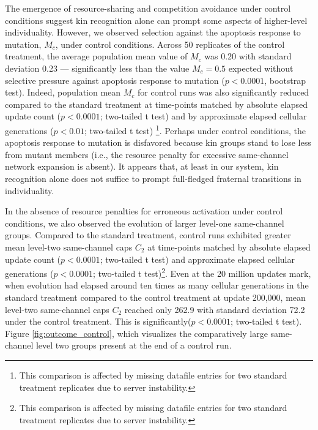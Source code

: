 The emergence of resource-sharing and competition avoidance under control conditions suggest kin recognition alone can prompt some aspects of higher-level individuality.
However, we observed selection against the apoptosis response to mutation, $M_{c}$, under control conditions.
Across 50 replicates of the control treatment, the average population mean value of $M_{c}$ was 0.20 with standard deviation 0.23 --- significantly less than the value $M_{c} = 0.5$ expected without selective pressure against apoptosis response to mutation ($p < 0.0001$, bootstrap test).
Indeed, population mean $M_{c}$ for control runs was also significantly reduced compared to the standard treatment at time-points matched by absolute elapsed update count ($p < 0.0001$; two-tailed t test) and by approximate elapsed cellular generations ($p < 0.01$; two-tailed t test)
\footnote{This comparison is affected by missing datafile entries for two standard treatment replicates due to server instability.}.
Perhaps under control conditions, the apoptosis response to mutation is disfavored because kin groups stand to lose less from mutant members (i.e., the resource penalty for excessive same-channel network expansion is absent).
It appears that, at least in our system, kin recognition alone does not suffice to prompt full-fledged fraternal transitions in individuality.

In the absence of resource penalties for erroneous activation under control conditions, we also observed the evolution of larger level-one same-channel groups.
Compared to the standard treatment, control runs exhibited greater mean level-two same-channel caps $C_2$ at time-points matched by absolute elapsed update count ($p < 0.0001$; two-tailed t test) and approximate elapsed cellular generations ($p < 0.0001$; two-tailed t test)\footnote{This comparison is affected by missing datafile entries for two standard treatment replicates due to server instability.}.
Even at the 20 million updates mark, when evolution had elapsed around ten times as many cellular generations in the standard treatment compared to the control treatment at update 200,000, mean level-two same-channel caps $C_2$ reached only 262.9 with standard deviation 72.2 under the control treatment.
This is significantly($p < 0.0001$; two-tailed t test).
Figure \ref{fig:outcome_control}, which visualizes the comparatively large same-channel level two groups present at the end of a control run.
